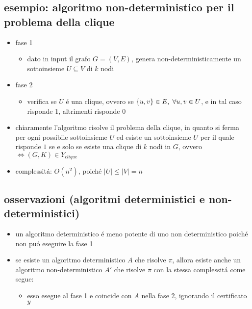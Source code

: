 \subsection*{\color{cyan} esempio: algoritmo non-deterministico per il problema della clique}
\begin{flushleft}
	\begin{itemize}
		\item fase 1
		\begin{itemize}
			\item dato in input il grafo $G=(V,E)$, genera non-deterministicamente un sottoinsieme $U\subseteq V$ di $k$ nodi
		\end{itemize}
		\item fase 2
		\begin{itemize}
			\item verifica se $U$ \'e una clique, ovvero se $\{u,v\}\in E,\hspace{0.1cm}\forall u,v\in U$, e in tal caso risponde $1$, altrimenti risponde $0$
		\end{itemize}
	\item chiaramente l'algoritmo risolve il problema della clique, in quanto si ferma per ogni possibile sottoinsieme $U$ ed esiste un sottoinsieme $U$ per il quale risponde $1$ se e solo se esiste una clique di $k$ nodi in $G$, ovvero $\iff(G,K)\in Y_{clique}$
	\item complessit\'a: $O(n^2)$, poich\'e $|U|\leq|V|=n$
	\end{itemize}
\end{flushleft}


\subsection*{\color{cyan} osservazioni (algoritmi deterministici e non-deterministici)}
\begin{flushleft}
	\begin{itemize}
		\item un algoritmo deterministico \'e meno potente di uno non deterministico poich\'e non pu\'o eseguire la fase 1
		\item se esiste un algoritmo deterministico $A$ che risolve $\pi$, allora esiste anche un algoritmo non-deterministico $A'$ che risolve $\pi$ con la stessa complessit\'a come segue:
			\begin{itemize}
				\item esso esegue al fase 1 e coincide con $A$ nella fase 2, ignorando il certificato $y$
			\end{itemize}
	\end{itemize}
\end{flushleft}


